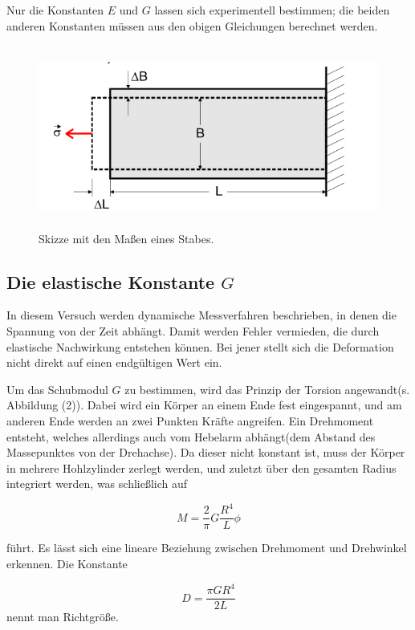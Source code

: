 Nur die Konstanten $E$ und $G$ lassen sich experimentell bestimmen; die beiden anderen Konstanten 
müssen aus den obigen Gleichungen berechnet werden. 

\begin{figure}[H]
 \centering
  \includegraphics[height=6cm]{Screenshot (7).png}
  \caption{Skizze mit den Maßen eines Stabes.\cite{kent}}
  \label{fig:drill}
\end{figure}


\subsection{Die elastische Konstante $G$}

In diesem Versuch werden dynamische Messverfahren beschrieben, in denen die Spannung von der Zeit abhängt.
Damit werden Fehler vermieden, die durch elastische Nachwirkung entstehen können. Bei jener stellt sich die Deformation nicht direkt auf einen endgültigen Wert ein.

Um das Schubmodul $G$ zu bestimmen, wird das Prinzip der Torsion angewandt(s. Abbildung (2)).
Dabei wird ein Körper an einem Ende fest eingespannt, und am anderen Ende werden an zwei Punkten Kräfte angreifen.
Ein Drehmoment entsteht, welches allerdings auch vom Hebelarm abhängt(dem Abstand des Massepunktes von der Drehachse).
Da dieser nicht konstant ist, muss der Körper in mehrere Hohlzylinder zerlegt werden, und zuletzt über den gesamten Radius integriert werden, was  schließlich auf

\begin{equation}
  M = \frac{2}{\pi}G\frac{R^{4}}{L}\phi
\end{equation}

führt. Es lässt sich eine lineare Beziehung zwischen Drehmoment und Drehwinkel erkennen.
Die Konstante 

\begin{equation}
  D = \frac{\pi G R^{4}}{2L}
\end{equation}
nennt man Richtgröße.

